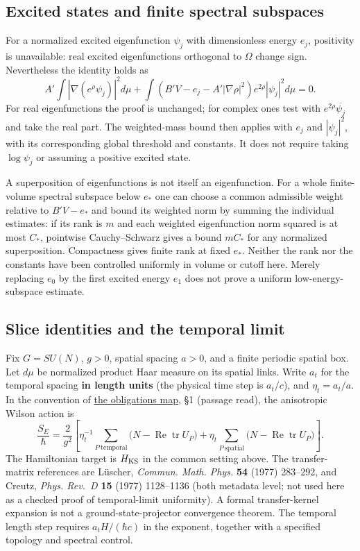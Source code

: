 \documentclass[11pt,a4paper]{article}
\begin{document}
\hypertarget{excited-states-and-finite-spectral-subspaces}{%
\subsection{Excited states and finite spectral
subspaces}\label{excited-states-and-finite-spectral-subspaces}}

For a normalized excited eigenfunction \(\psi_j\) with dimensionless
energy \(e_j\), positivity is unavailable: real excited eigenfunctions
orthogonal to \(\Omega\) change sign. Nevertheless the identity holds as
\[A'\int|\nabla(e^\rho\psi_j)|^2d\mu
+\int(B'V-e_j-A'|\nabla\rho|^2)e^{2\rho}|\psi_j|^2d\mu=0.\] For real
eigenfunctions the proof is unchanged; for complex ones test with
\(e^{2\rho}\overline{\psi_j}\) and take the real part. The weighted-mass
bound then applies with \(e_j\) and \(|\psi_j|^2\), with its
corresponding global threshold and constants. It does not require taking
\(\log\psi_j\) or assuming a positive excited state.

A superposition of eigenfunctions is not itself an eigenfunction. For a
whole finite-volume spectral subspace below \(e_*\) one can choose a
common admissible weight relative to \(B'V-e_*\) and bound its weighted
norm by summing the individual estimates: if its rank is \(m\) and each
weighted eigenfunction norm squared is at most \(C_*\), pointwise
Cauchy--Schwarz gives a bound \(mC_*\) for any normalized superposition.
Compactness gives finite rank at fixed \(e_*\). Neither the rank nor the
constants have been controlled uniformly in volume or cutoff here.
Merely replacing \(e_0\) by the first excited energy \(e_1\) does not
prove a uniform low-energy-subspace estimate.

\hypertarget{slice-identities-and-the-temporal-limit}{%
\subsection{Slice identities and the temporal
limit}\label{slice-identities-and-the-temporal-limit}}

Fix \(G=SU(N)\), \(g>0\), spatial spacing \(a>0\), and a finite periodic
spatial box. Let \(d\mu\) be normalized product Haar measure on its
spatial links. Write \(a_t\) for the temporal spacing \textbf{in length
units} (the physical time step is \(a_t/c\)), and \(\eta_t=a_t/a\). In
the convention of \href{mass-gap-obligations-lattice.md}{the obligations
map}, §1 (passage read), the anisotropic Wilson action is
\[\frac{S_E}{\hbar}=\frac{2}{g^2}\left[
\eta_t^{-1}\sum_{P\ \mathrm{temporal}}
\big(N-\operatorname{Re}\operatorname{tr}U_P\big)
+\eta_t\sum_{P\ \mathrm{spatial}}
\big(N-\operatorname{Re}\operatorname{tr}U_P\big)\right].\] The
Hamiltonian target is \(H_{\rm KS}\) in the common setting above. The
transfer-matrix references are Lüscher, \emph{Commun. Math. Phys.}
\textbf{54} (1977) 283--292, and Creutz, \emph{Phys. Rev.~D} \textbf{15}
(1977) 1128--1136 (both metadata level; not used here as a checked proof
of temporal-limit uniformity). A formal transfer-kernel expansion is not
a ground-state-projector convergence theorem. The temporal length step
requires \(a_tH/(\hbar c)\) in the exponent, together with a specified
topology and spectral control.
\end{document}
